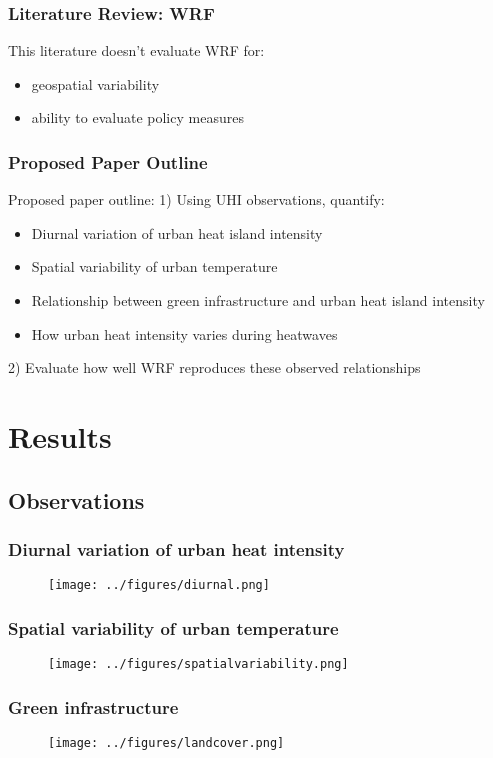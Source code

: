 \documentclass[aspectratio=169, 10pt]{beamer}
\begin{document}
\begin{frame}
\frametitle{Literature Review: WRF}
This literature doesn't evaluate WRF for: 
\begin{itemize}
\item geospatial variability
\item ability to evaluate policy measures
\end{itemize}
\end{frame}

\begin{frame}
\frametitle{Proposed Paper Outline}

Proposed paper outline: 
1) Using UHI observations, quantify: 
\begin{itemize}
\item Diurnal variation of urban heat island intensity
\item Spatial variability of urban temperature
\item Relationship between green infrastructure and urban heat island intensity
\item How urban heat intensity varies during heatwaves
\end{itemize}
2) Evaluate how well WRF reproduces these observed relationships 
\end{frame}
\section{Results}
\subsection{Observations}
\begin{frame}
\frametitle{Diurnal variation of urban heat intensity}
\begin{figure}
\texttt{[image: ../figures/diurnal.png]}
\end{figure}
\end{frame}

\begin{frame}
\frametitle{Spatial variability of urban temperature}
\begin{figure}
\texttt{[image: ../figures/spatialvariability.png]}
\end{figure}
\end{frame}

\begin{frame}
\frametitle{Green infrastructure}
\begin{figure}
\texttt{[image: ../figures/landcover.png]}
\end{figure}
\end{frame}
\end{document}
